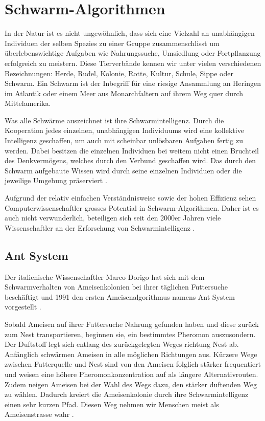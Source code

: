 \chapter{Schwarm-Algorithmen}

In der Natur ist es nicht ungewöhnlich, dass sich eine Vielzahl an unabhängigen Individuen
der selben Spezies zu einer Gruppe zusammenschlisst um überlebenswichtige Aufgaben wie
Nahrungssuche, Umsiedlung oder Fortpflanzung erfolgreich zu meistern. Diese Tierverbände kennen
wir unter vielen verschiedenen Bezeichnungen: Herde, Rudel, Kolonie, Rotte, Kultur, Schule, Sippe
oder Schwarm. Ein Schwarm ist der Inbegriff für eine riesige Ansammlung an Heringen im Atlantik
oder einem Meer aus Monarchfaltern auf ihrem Weg quer durch Mittelamerika.

Was alle Schwärme auszeichnet ist ihre Schwarmintelligenz. Durch die Kooperation jedes einzelnen,
unabhängigen Individuums wird eine kollektive Intelligenz geschaffen, um auch mit scheinbar
unlösbaren Aufgaben fertig zu werden. Dabei besitzen die einzelnen Individuen bei weitem nicht
einen Bruchteil des Denkvermögens, welches durch den Verbund geschaffen wird. Das durch den Schwarm
aufgebaute Wissen wird durch seine einzelnen Individuen oder die jeweilige Umgebung präserviert
\cite[Kap. 6.1]{Bro11}.

Aufgrund der relativ einfachen Verständnisweise sowie der hohen Effizienz sehen Computerwissenschaftler
grosses Potential in Schwarm-Algorithmen. Daher ist es auch nicht verwunderlich, beteiligen sich seit
den 2000er Jahren viele Wissenschaftler an der Erforschung von Schwarmintelligenz \cite{LL18}.

\section{Ant System}
Der italienische Wissenschaftler Marco Dorigo hat sich mit dem Schwarmverhalten von Ameisenkolonien bei 
ihrer täglichen Futtersuche beschäftigt und 1991 den ersten Ameisenalgorithmus namens Ant System
vorgestellt \cite{Wiki03}.

Sobald Ameisen auf ihrer Futtersuche Nahrung gefunden haben und diese zurück zum Nest transportieren, beginnen
sie, ein bestimmtes Pheromon auszusondern. Der Duftstoff legt sich entlang des zurückgelegten Weges richtung
Nest ab. Anfänglich schwärmen Ameisen in alle möglichen Richtungen aus. Kürzere Wege zwischen Futterquelle und
Nest sind von den Ameisen folglich stärker frequentiert und weisen eine höhere Pheromonkonzentration auf als
längere Alternativrouten. Zudem neigen Ameisen bei der Wahl des Wegs dazu, den stärker duftenden Weg zu wählen.
Dadurch kreiert die Ameisenkolonie durch ihre Schwarmintelligenz einen sehr kurzen Pfad. Diesen Weg nehmen wir
Menschen meist als Ameisenstrasse wahr \cite[Kap. 6.3]{Bro11}.

